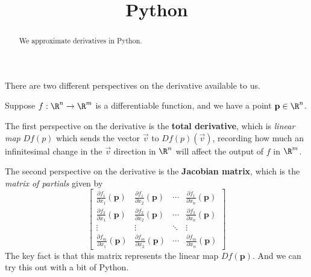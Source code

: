 \documentclass{ximera}
\title{Python}
\begin{document}
\begin{abstract}
  We approximate derivatives in Python.
\end{abstract}

There are two different perspectives on the derivative available to us.

Suppose $f : \R^n \to \R^m$ is a differentiable function, and we have
a point $\mathbf{p} \in \R^n$.

The first perspective on the derivative is the \textbf{total
  derivative}, which is \textit{linear map} $Df(p)$ which sends the
vector $\vec{v}$ to $Df(p)(\vec{v})$, recording how much an
infinitesimal change in the $\vec{v}$ direction in $\R^n$ will affect
the output of $f$ in $\R^m$.

The second perspective on the derivative is the \textbf{Jacobian
  matrix}, which is the \textit{matrix of partials} given by
\[
\begin{bmatrix}
  \frac{\partial f_1}{\partial x_1} \left(\mathbf{p}\right) & \frac{\partial f_1}{\partial x_2} \left(\mathbf{p}\right) & \cdots & \frac{\partial f_1}{\partial x_n}\left(\mathbf{p}\right) \\
  \frac{\partial f_2}{\partial x_1} \left(\mathbf{p}\right) & \frac{\partial f_2}{\partial x_2} \left(\mathbf{p}\right) & \cdots & \frac{\partial f_2}{\partial x_n}\left(\mathbf{p}\right) \\
  \vdots                                                    & \vdots                                                    & \ddots & \vdots \\
  \frac{\partial f_m}{\partial x_1} \left(\mathbf{p}\right) & \frac{\partial f_m}{\partial x_2} \left(\mathbf{p}\right) & \cdots & \frac{\partial f_m}{\partial x_n}\left(\mathbf{p}\right) 
\end{bmatrix}
\]
The key fact is that this matrix represents the linear map $Df(\mathbf{p})$.  And we can try this out with a bit of Python.
\end{document}
